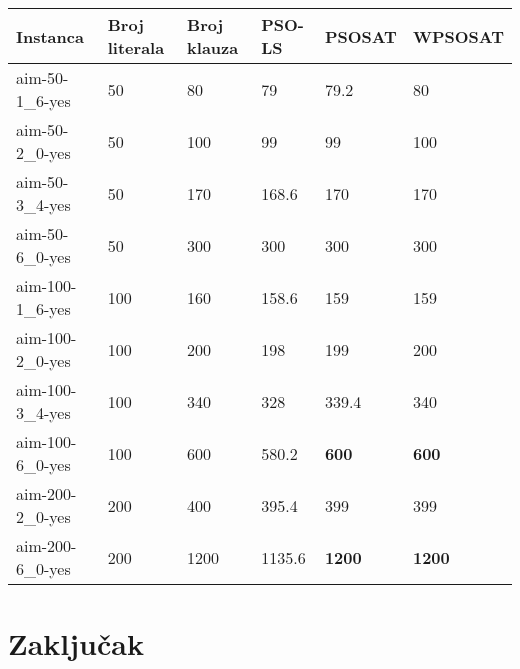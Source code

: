 \documentclass{article}
\begin{document}
\begin{table}[h!]
\centering
{}\label{tab:SAT} 
\begin{tabular}{ |p{3cm}|p{2cm}|p{2cm}||p{2cm}|p{2cm}|p{2cm}|}  \hline
 Instanca & Broj literala & Broj klauza & PSO-LS & PSOSAT & WPSOSAT \\ \hline
 aim-50-1\_6-yes & 50 & 80 & 79 & 79.2 & 80 \\ \hline
 aim-50-2\_0-yes & 50 & 100 & 99 & 99 & 100 \\ \hline
 aim-50-3\_4-yes & 50 & 170 & 168.6 & 170 & 170 \\ \hline
 aim-50-6\_0-yes & 50 & 300 & 300 & 300 & 300 \\ \hline
 \hline
 aim-100-1\_6-yes & 100 & 160 & 158.6 & 159 & 159 \\ \hline
 aim-100-2\_0-yes & 100 & 200 & 198 & 199 & 200 \\ \hline
 aim-100-3\_4-yes & 100 & 340 & 328 & 339.4 & 340 \\ \hline
 aim-100-6\_0-yes & 100 & 600 & 580.2 & \textbf{600} & \textbf{600} \\ \hline
 \hline
 aim-200-2\_0-yes & 200 & 400 & 395.4 & 399 & 399 \\ \hline
 aim-200-6\_0-yes & 200 & 1200 & 1135.6 & \textbf{1200} & \textbf{1200} \\ \hline
\end{tabular}
\end{table}


\section{Zaključak}
\label{sec:zakljucak}


\appendix
 

\end{document}
